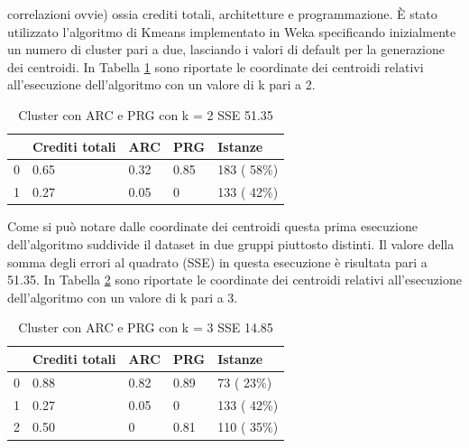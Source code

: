 \documentclass[12pt]{article}
\begin{document}
correlazioni ovvie) ossia crediti totali, architetture e programmazione.
È stato utilizzato l'algoritmo di Kmeans implementato in Weka specificando ini\-zialmente un numero di cluster pari a due, lasciando i valori di default per la generazione dei centroidi.
In Tabella \ref{c2AP} sono riporta\-te le coordinate dei centroidi relativi all'esecuzione dell'algoritmo con un valore di k pari a 2.
\begin{table}[ht]
	\centering
	\begin{tabular}{@{}lllll@{}}
	\toprule
	  & Crediti totali & ARC  & PRG  & Istanze\\ \midrule
	0 & 0.65           & 0.32 & 0.85 & 183 ( 58\%)\\
	1 & 0.27           & 0.05 & 0    & 133 ( 42\%)\\ \bottomrule
	\end{tabular}
	\caption{Cluster con ARC e PRG con k = 2 SSE 51.35}
	\label{c2AP}
\end{table}
Come si può notare dalle coordinate dei centroidi questa prima esecuzione dell'algoritmo suddivide il dataset in due gruppi piuttosto distinti.
Il valore della somma degli errori al quadrato (SSE) in questa esecuzione è risultata pari a 51.35.
In Tabella \ref{c3AP} sono riportate le coordinate dei centroidi relativi all'esecuzione dell'algoritmo con un valore di k pari a 3.
\begin{table}[ht]
	\centering
	\begin{tabular}{@{}lllll@{}}
	\toprule
	  & Crediti totali & ARC  & PRG  & Istanze\\ \midrule
	0 & 0.88           & 0.82 & 0.89 & 73 ( 23\%)\\
	1 & 0.27           & 0.05 & 0    & 133 ( 42\%)\\
	2 & 0.50           & 0    & 0.81 & 110 ( 35\%)\\ \bottomrule
	\end{tabular}
	\caption{Cluster con ARC e PRG con k = 3 SSE 14.85}
	\label{c3AP}
\end{table}
\end{document}
